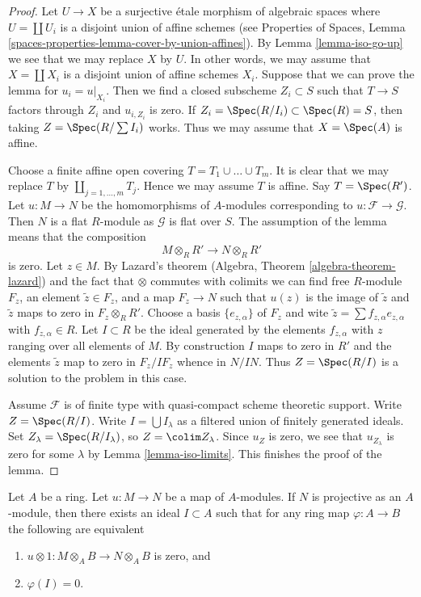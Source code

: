 \begin{proof}
Let $U \to X$ be a surjective \'etale morphism of algebraic spaces
where $U = \coprod U_i$ is a disjoint union of affine schemes (see
Properties of Spaces, Lemma
\ref{spaces-properties-lemma-cover-by-union-affines}).
By Lemma \ref{lemma-iso-go-up} we see that we may
replace $X$ by $U$. In other words, we may assume that $X = \coprod X_i$
is a disjoint union of affine schemes $X_i$. Suppose that we can prove
the lemma for $u_i = u|_{X_i}$. Then we find a closed subscheme
$Z_i \subset S$ such that $T \to S$ factors through $Z_i$ and
$u_{i, Z_i}$ is zero. If
$Z_i = \Spec(R/I_i) \subset \Spec(R) = S$, then taking
$Z = \Spec(R/\sum I_i)$ works. Thus we may assume that
$X = \Spec(A)$ is affine.

\medskip\noindent
Choose a finite affine open covering $T = T_1 \cup \ldots \cup T_m$.
It is clear that we may replace $T$ by $\coprod_{j = 1, \ldots, m} T_j$.
Hence we may assume $T$ is affine. Say $T = \Spec(R')$.
Let $u : M \to N$ be the homomorphisms of $A$-modules
corresponding to $u : \mathcal{F} \to \mathcal{G}$.
Then $N$ is a flat $R$-module as $\mathcal{G}$ is flat over $S$.
The assumption of the lemma means that the composition
$$
M \otimes_R R' \to N \otimes_R R'
$$
is zero. Let $z \in M$. By Lazard's theorem
(Algebra, Theorem \ref{algebra-theorem-lazard}) and the fact
that $\otimes$ commutes with colimits we can find free $R$-module
$F_z$, an element $\tilde z \in F_z$, and a map $F_z \to N$ such that
$u(z)$ is the image of $\tilde z$ and $\tilde z$ maps to zero in
$F_z \otimes_R R'$. Choose a basis $\{e_{z, \alpha}\}$ of $F_z$ and wite
$\tilde z = \sum f_{z, \alpha} e_{z, \alpha}$ with $f_{z, \alpha} \in R$.
Let $I \subset R$ be the ideal generated by the elements $f_{z, \alpha}$
with $z$ ranging over all elements of $M$.
By construction $I$ maps to zero in $R'$ and the elements $\tilde z$
map to zero in $F_z/IF_z$ whence in $N/IN$. Thus $Z = \Spec(R/I)$
is a solution to the problem in this case.

\medskip\noindent
Assume $\mathcal{F}$ is of finite type with quasi-compact scheme
theoretic support. Write $Z = \Spec(R/I)$.
Write $I = \bigcup I_\lambda$ as a filtered union of finitely generated
ideals. Set $Z_\lambda = \Spec(R/I_\lambda)$, so $Z = \colim Z_\lambda$.
Since $u_Z$ is zero, we see that $u_{Z_\lambda}$ is zero
for some $\lambda$ by Lemma \ref{lemma-iso-limits}.
This finishes the proof of the lemma.
\end{proof}

\begin{lemma}
\label{lemma-F-zero-module-map}
Let $A$ be a ring. Let $u : M \to N$ be a map of $A$-modules.
If $N$ is projective as an $A$-module, then there exists an ideal
$I \subset A$ such that for any ring map $\varphi : A \to B$
the following are equivalent
\begin{enumerate}
\item $u \otimes 1 : M \otimes_A B \to N \otimes_A B$ is zero, and
\item $\varphi(I) = 0$.
\end{enumerate}
\end{lemma}

